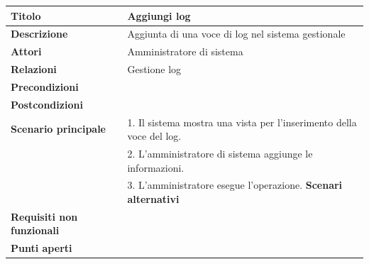 \documentclass[a4paper]{article}
\begin{document}

\begin{table}[ht!]
  \begin{center}
    \begin{tabulary}{1\textwidth}{l|L}
        \textbf{Titolo} & Aggiungi log \\
        \hline
        \textbf{Descrizione} & Aggiunta di una voce di log nel sistema gestionale \\
        \hline
        \textbf{Attori} & Amministratore di sistema \\
        \hline
        \textbf{Relazioni} & Gestione log \\
        \hline
        \textbf{Precondizioni} &  \\
        \hline
        \textbf{Postcondizioni} &  \\
        \hline
        \textbf{Scenario principale} & 1. Il sistema mostra una vista per l'inserimento della voce del log.\\
                                     & 2. L'amministratore di sistema aggiunge le informazioni.\\
                                     & 3. L'amministratore esegue l'operazione.
        \hline
        \textbf{Scenari alternativi} & \\
        \hline
        \textbf{Requisiti non funzionali} & \\
        \hline
        \textbf{Punti aperti} & \\
        \hline
    \end{tabulary}
  \end{center}
\end{table}

\end{document}
